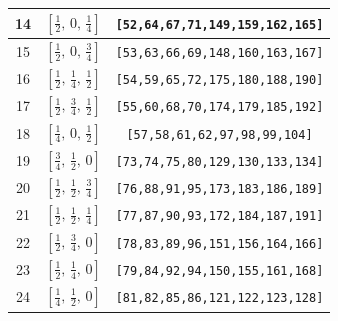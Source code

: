 \documentclass[fleqn,8pt]{jsarticle}
\begin{document}
\begin{longtable}{ccc}
14 & $\left[ \frac{1}{2},\, 0,\, \frac{1}{4} \right]$ & {\tt [52,64,67,71,149,159,162,165]} \\ \hline
15 & $\left[ \frac{1}{2},\, 0,\, \frac{3}{4} \right]$ & {\tt [53,63,66,69,148,160,163,167]} \\ \hline
16 & $\left[ \frac{1}{2},\, \frac{1}{4},\, \frac{1}{2} \right]$ & {\tt [54,59,65,72,175,180,188,190]} \\ \hline
17 & $\left[ \frac{1}{2},\, \frac{3}{4},\, \frac{1}{2} \right]$ & {\tt [55,60,68,70,174,179,185,192]} \\ \hline
18 & $\left[ \frac{1}{4},\, 0,\, \frac{1}{2} \right]$ & {\tt [57,58,61,62,97,98,99,104]} \\ \hline
19 & $\left[ \frac{3}{4},\, \frac{1}{2},\, 0 \right]$ & {\tt [73,74,75,80,129,130,133,134]} \\ \hline
20 & $\left[ \frac{1}{2},\, \frac{1}{2},\, \frac{3}{4} \right]$ & {\tt [76,88,91,95,173,183,186,189]} \\ \hline
21 & $\left[ \frac{1}{2},\, \frac{1}{2},\, \frac{1}{4} \right]$ & {\tt [77,87,90,93,172,184,187,191]} \\ \hline
22 & $\left[ \frac{1}{2},\, \frac{3}{4},\, 0 \right]$ & {\tt [78,83,89,96,151,156,164,166]} \\ \hline
23 & $\left[ \frac{1}{2},\, \frac{1}{4},\, 0 \right]$ & {\tt [79,84,92,94,150,155,161,168]} \\ \hline
24 & $\left[ \frac{1}{4},\, \frac{1}{2},\, 0 \right]$ & {\tt [81,82,85,86,121,122,123,128]} \\
\end{longtable}
\renewcommand{\arraystretch}{1.2}
\end{document}
